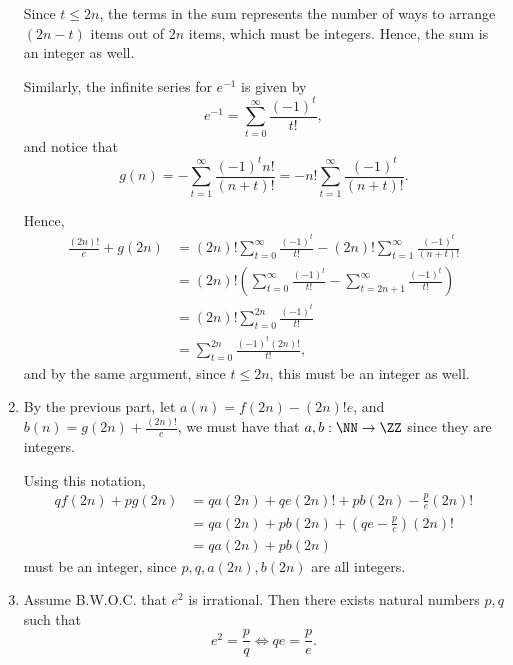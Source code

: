 \begin{enumerate}
          Since \(t \leq 2n\), the terms in the sum represents the number of ways to arrange \((2n - t)\) items out of \(2n\) items, which must be integers. Hence, the sum is an integer as well.

          Similarly, the infinite series for \(e^{-1}\) is given by
          \[
              e^{-1} = \sum_{t = 0}^{\infty} \frac{(-1)^t}{t!},
          \]
          and notice that
          \[
              g(n) = - \sum_{t = 1}^{\infty} \frac{(-1)^t n!}{(n + t)!} = - n! \sum_{t = 1}^{\infty} \frac{(-1)^t}{(n + t)!}.
          \]

          Hence,
          \begin{align*}
              \frac{(2n)!}{e} + g(2n) & = (2n)! \sum_{t = 0}^{\infty} \frac{(-1)^t}{t!} - (2n)! \sum_{t = 1}^{\infty} \frac{(-1)^t}{(n + t)!}       \\
                                      & = (2n)! \left(\sum_{t = 0}^{\infty} \frac{(-1)^t}{t!} - \sum_{t = 2n + 1}^{\infty} \frac{(-1)^t}{t!}\right) \\
                                      & = (2n)! \sum_{t = 0}^{2n} \frac{(-1)^t}{t!}                                                                 \\
                                      & = \sum_{t = 0}^{2n} \frac{(-1)^t (2n)!}{t!},
          \end{align*}
          and by the same argument, since \(t \leq 2n\), this must be an integer as well.

    \item By the previous part, let \(a(n) = f(2n) - (2n)!e\), and \(b(n) = g(2n) + \frac{(2n)!}{e}\), we must have that \(a, b: \NN \to \ZZ\) since they are integers.

          Using this notation,
          \begin{align*}
              q f(2n) + p g(2n) & = q a(2n) + qe (2n)! + p b(2n) - \frac{p}{e} (2n)!        \\
                                & = q a(2n) + p b(2n) + \left(qe - \frac{p}{e}\right) (2n)! \\
                                & = q a(2n) + p b(2n)
          \end{align*}
          must be an integer, since \(p, q, a(2n), b(2n)\) are all integers.

    \item Assume B.W.O.C. that \(e^2\) is irrational. Then there exists natural numbers \(p, q\) such that
          \[
              e^2 = \frac{p}{q} \iff qe = \frac{p}{e}.
          \]


\end{enumerate}
